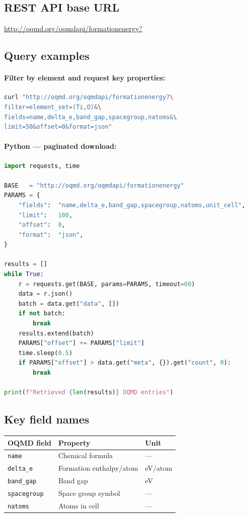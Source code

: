 \documentclass[11pt,a4paper]{article}
\begin{document}
\subsection{REST API base URL}
\begin{center}
\url{http://oqmd.org/oqmdapi/formationenergy?}
\end{center}

\subsection{Query examples}

\paragraph{Filter by element and request key properties:}
\begin{lstlisting}[language=bash]
curl "http://oqmd.org/oqmdapi/formationenergy?\
filter=element_set=(Ti,O)&\
fields=name,delta_e,band_gap,spacegroup,natoms&\
limit=50&offset=0&format=json"
\end{lstlisting}

\paragraph{Python --- paginated download:}
\begin{lstlisting}[language=Python]
import requests, time

BASE   = "http://oqmd.org/oqmdapi/formationenergy"
PARAMS = {
    "fields":  "name,delta_e,band_gap,spacegroup,natoms,unit_cell",
    "limit":   100,
    "offset":  0,
    "format":  "json",
}

results = []
while True:
    r = requests.get(BASE, params=PARAMS, timeout=60)
    data = r.json()
    batch = data.get("data", [])
    if not batch:
        break
    results.extend(batch)
    PARAMS["offset"] += PARAMS["limit"]
    time.sleep(0.5)
    if PARAMS["offset"] > data.get("meta", {}).get("count", 0):
        break

print(f"Retrieved {len(results)} OQMD entries")
\end{lstlisting}

\subsection{Key field names}
\begin{center}
\begin{tabular}{lll}
\toprule
OQMD field     & Property             & Unit \\
\midrule
\texttt{name}      & Chemical formula         & --- \\
\texttt{delta\_e}  & Formation enthalpy/atom  & eV/atom \\
\texttt{band\_gap} & Band gap                 & eV \\
\texttt{spacegroup}& Space group symbol       & --- \\
\texttt{natoms}    & Atoms in cell            & --- \\
\bottomrule
\end{tabular}
\end{center}
\end{document}
